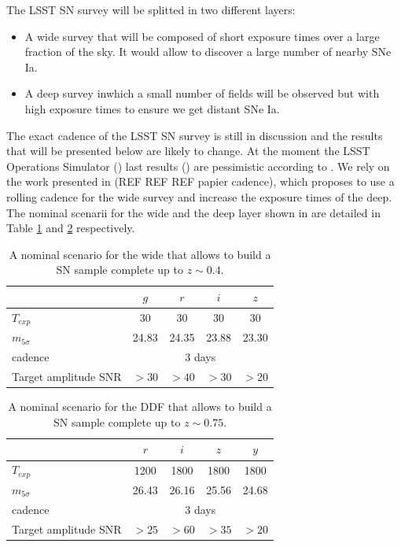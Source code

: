 \documentclass[\docopts]{\docclass}
\begin{document}
The LSST SN survey will be splitted in two different layers:
\begin{itemize}
\item A wide survey that will be composed of short exposure times over a large fraction of the sky.
  It would allow to discover a large number of nearby SNe Ia.
\item A deep survey inwhich a small number of fields will be observed but with high exposure times to ensure we get distant SNe Ia.
\end{itemize}
The exact cadence of the LSST SN survey is still in discussion and the results that will be presented below are likely to change.
At the moment the LSST Operations Simulator () last results () are pessimistic  according to \cite{SN-CADENCE}.
We rely on the work presented in (REF REF REF papier cadence), which proposes to use a rolling cadence for the wide survey and increase the exposure times of the deep. The nominal scenarii for the wide and the deep layer shown in \cite{SN-CADENCE} are detailed in Table \ref{tab:nominal_scenario_wide} and \ref{tab:nominal_scenario_DDF} respectively.

\begin{table}[t]
\begin{center}
\caption{A nominal scenario for the wide that allows to build a SN
  sample complete up to $z \sim 0.4$.}
\label{tab:nominal_scenario_wide}
\begin{tabular}{l|cccc}
\hline
\hline
              & $g$ & $r$ & $i$ & $z$ \\
\hline 
$T_{exp}$      & 30       &   30    &  30        & 30       \\
$m_{5\sigma}$  &  24.83   &  24.35   &  23.88    &  23.30   \\
cadence       &  \multicolumn{4}{c}{3 days} \\
Target amplitude SNR & $>30$ & $>40$ & $>30$ & $>20$ \\
\hline
\end{tabular}
\end{center}
\end{table}

\begin{table}[t]
\begin{center}
\caption{A nominal scenario for the DDF that allows to build a SN
  sample complete up to $z \sim 0.75$.}
\label{tab:nominal_scenario_DDF}
\begin{tabular}{l|cccc}
\hline
\hline
              & $r$ & $i$ & $z$ & $y$ \\
\hline 
$T_{exp}$      & 1200 & 1800 & 1800 & 1800 \\
$m_{5\sigma}$  & 26.43    & 26.16    &  25.56    &  24.68   \\
cadence       &  \multicolumn{4}{c}{3 days} \\
Target amplitude SNR & $>25$ & $>60$ & $>35$ & $>20$ \\
\hline
\end{tabular}
\end{center}
\end{table}
\end{document}
